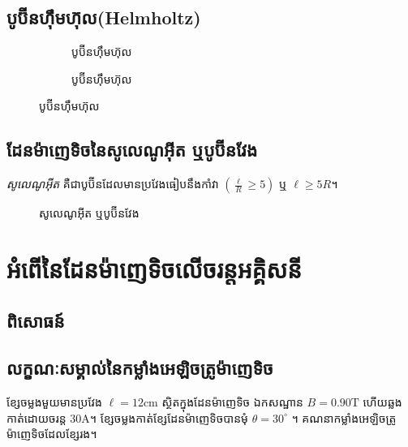 \subsection{បូប៊ីនហ៊ឹមហ៊ុល{\en(Helmholtz)}}
\begin{figure}[H]
	\begin{subfigure}{.5\textwidth}
		\centering
		\caption{បូប៊ីនហ៊ឹមហ៊ុល}
	\end{subfigure}
	\begin{subfigure}{.5\textwidth}
		\centering
		\caption{បូប៊ីនហ៊ឹមហ៊ុល}
	\end{subfigure}
\end{figure}
\subsection{ដែនម៉ាញេទិចនៃសូលេណូអ៊ីត ឬបូប៊ីនវែង}
\begin{definition}
	\emph{\kml សូលេណូអ៊ីត} គឺជាបូប៊ីនដែលមានប្រវែងធៀបនឹងកាំវា $\left(\frac{\ell}{R}\ge5\right)$ ឬ $\ell\ge 5R$។
\end{definition}
\begin{figure}[H]
	\centering
	\caption{សូលេណូអ៊ីត ឬបូប៊ីនវែង}
\end{figure}
\section{អំពើនៃដែនម៉ាញេទិចលើចរន្តអគ្គិសនី}
\subsection{ពិសោធន៍}
\subsection{លក្ខណៈសម្គាល់នៃកម្លាំងអេឡិចត្រូម៉ាញេទិច}
\begin{example}
	ខ្សែចម្លងមួយមានប្រវែង $\ell=12\si{\centi\metre}$ ស្ថិតក្នុងដែនម៉ាញេទិច ឯកសណ្ឋាន $B=0.90\si{\tesla}$ ហើយឆ្លងកាត់ដោយចរន្ត $30\si{\ampere}$។ ខ្សែចម្លងកាត់ខ្សែដែនម៉ាញេទិចបានមុំ $\theta=\si{30^\circ}$ ។ គណនាកម្លាំងអេឡិចត្រូម៉ាញេទិចដែលខ្សែរង។
\end{example}
